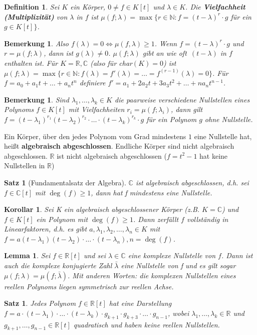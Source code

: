 \documentclass[12pt,a4paper]{article}
\theoremstyle{plain}
\newtheorem{Satz}[Theorem]{Satz}
\newtheorem{Lemma}[Theorem]{Lemma}
\newtheorem{Korollar}[Theorem]{Korollar}
\newtheorem{Definition}[Theorem]{Definition}
\newtheorem{Bemerkung}[Theorem]{Bemerkung}
\newcommand{\herv}[1]{{\emph{\textbf{#1}}}}
\newcommand{\N}{\mathbb{N}}
\newcommand{\R}{\mathbb{R}}
\newcommand{\C}{\mathbb{C}}
\numberwithin{equation}{section}
\begin{document}
\begin{Definition}
Sei $K$ ein Körper, $0\neq f\in K[t]$ und $\lambda\in K$. Die \herv{Vielfachheit (Multiplizität)} von $\lambda$ in $f$ ist $\mu(f;\lambda)=\max\{r\in\N:f=(t-\lambda)^r\cdot g$ für ein $g\in K[t]\}$.
\end{Definition}
\begin{Bemerkung}
Also $f(\lambda)=0\Leftrightarrow \mu(f,\lambda)\geq 1$. Wenn $f=(t-\lambda)^r\cdot g$ und $r=\mu(f;\lambda)$, dann ist $g(\lambda)\neq 0$. $\mu(f;\lambda)$ gibt an \glqq wie oft\grqq\ $(t-\lambda)$ in $f$ enthalten ist.
Für $K=\R,\C$ (also für char$(K)=0$) ist $\mu(f;\lambda)=\max\{r\in \N: f(\lambda)=f'(\lambda)=\ldots=f^{(r-1)}(\lambda)=0\}$. Für $f=a_0+a_1t+\ldots+a_nt^n$ definiere $f'=a_1+2a_2t+3a_3t^2+\ldots+na_nt^{n-1}$.\end{Bemerkung}
\begin{Bemerkung}
Sind $\lambda_1,\ldots,\lambda_k\in K$ die paarweise verschiedene Nullstellen eines Polynoms $f\in K[t]$ mit Vielfachheiten $r_i=\mu(f;\lambda_i)$, dann gilt $f=(t-\lambda_1)^{r_1}(t-\lambda_2)^{r_2}\cdot\ldots\cdot(t-\lambda_k)^{r_k}\cdot g$ für ein Polynom $g$ ohne Nullstelle.
\end{Bemerkung}
Ein Körper, über den jedes Polynom vom Grad mindestens $1$ eine Nullstelle hat, heißt \textbf{algebraisch abgeschlossen}. Endliche Körper sind nicht algebraisch abgeschlossen. $\R$ ist nicht algebraisch abgeschlossen ($f=t^2-1$ hat keine Nullstellen in $\R$)
\begin{Satz}[Fundamentalsatz der Algebra]
$\C$ ist algebraisch abgeschlossen, d.h. sei $f\in \C[t]$ mit $\deg(f)\geq 1$, dann hat f mindestens eine Nullstelle.
\end{Satz}
\begin{Korollar}
Sei K ein algebraisch abgeschlossener Körper (z.B. $K=\C$) und $f\in K[t]$ ein Polynom mit $\deg(f)\geq 1$. Dann zerfällt $f$ vollständig in Linearfaktoren, d.h. es gibt $a,\lambda_1,\lambda_2,\ldots,\lambda_n\in K$ mit $f=a(t-\lambda_1)(t-\lambda_2)\cdot\ldots\cdot(t-\lambda_n), n=\deg(f)$.
\end{Korollar}
\begin{Lemma}
Sei $f\in\R[t]$ und sei $\lambda\in\C$ eine komplexe Nullstelle von $f$. Dann ist auch die komplexe konjugierte Zahl $\bar{\lambda}$ eine Nullstelle von f und es gilt sogar $\mu(f;\lambda)=\mu(f;\bar{\lambda})$. Mit anderen Worten: die komplexen Nullstellen eines reellen Polynoms liegen symmetrisch zur reellen Achse.
\end{Lemma}
\begin{Satz}
Jedes Polynom $f\in \R[t]$ hat eine Darstellung $f=a\cdot(t-\lambda_1)\cdot\ldots\cdot(t-\lambda_k)\cdot   g_{k+1}\cdot g_{k+3}\cdot\ldots\cdot g_{n-1}$, wobei $\lambda_1,\ldots,\lambda_k \in \R$ und $g_{k+1},\ldots,g_{n-1}\in \R[t]$ quadratisch und haben keine reellen Nullstellen.
\end{Satz}
\end{document}
